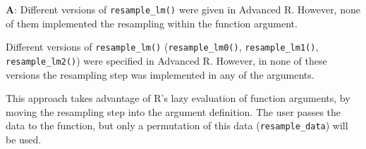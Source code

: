 \documentclass[
]{krantz}
\makeatletter
\newenvironment{Shaded}{\begin{snugshade}}{\end{snugshade}}
\newcommand{\CommentTok}[1]{\textcolor[rgb]{0.56,0.35,0.01}{\textit{#1}}}
\newcommand{\ControlFlowTok}[1]{\textcolor[rgb]{0.13,0.29,0.53}{\textbf{#1}}}
\newcommand{\DataTypeTok}[1]{\textcolor[rgb]{0.13,0.29,0.53}{#1}}
\newcommand{\DecValTok}[1]{\textcolor[rgb]{0.00,0.00,0.81}{#1}}
\newcommand{\KeywordTok}[1]{\textcolor[rgb]{0.13,0.29,0.53}{\textbf{#1}}}
\newcommand{\NormalTok}[1]{#1}
\newcommand{\OperatorTok}[1]{\textcolor[rgb]{0.81,0.36,0.00}{\textbf{#1}}}
\newcommand{\OtherTok}[1]{\textcolor[rgb]{0.56,0.35,0.01}{#1}}
\newcommand{\StringTok}[1]{\textcolor[rgb]{0.31,0.60,0.02}{#1}}
\newenvironment{kframe}{%
\medskip{}
\setlength{\fboxsep}{.8em}
 \def\at@end@of@kframe{}%
 \ifinner\ifhmode%
  \def\at@end@of@kframe{\end{minipage}}%
  \begin{minipage}{\columnwidth}%
 \fi\fi%
 \def\FrameCommand##1{\hskip\@totalleftmargin \hskip-\fboxsep
 \colorbox{shadecolor}{##1}\hskip-\fboxsep
     \hskip-\linewidth \hskip-\@totalleftmargin \hskip\columnwidth}%
 \MakeFramed {\advance\hsize-\width
   \@totalleftmargin\z@ \linewidth\hsize
   \@setminipage}}%
 {\par\unskip\endMakeFramed%
 \at@end@of@kframe}
\renewenvironment{Shaded}{\begin{kframe}}{\end{kframe}}
\renewcommand{\KeywordTok} [1]{\textcolor[rgb]{0.00,0.44,0.13}{{#1}}}
\renewcommand{\DataTypeTok}[1]{\textcolor[rgb]{0.56,0.13,0.00}{{#1}}}
\renewcommand{\DecValTok}  [1]{\textcolor[rgb]{0.25,0.63,0.44}{{#1}}}
\renewcommand{\StringTok}  [1]{\textcolor[rgb]{0.25,0.44,0.63}{{#1}}}
\renewcommand{\CommentTok} [1]{\textcolor[rgb]{0.38,0.63,0.69}{{#1}}}
\renewcommand{\OtherTok}   [1]{\textcolor[rgb]{0.00,0.44,0.13}{{#1}}}
\renewcommand{\NormalTok}  [1]{{#1}}
\makeatother
\begin{document}
\textbf{{A}}: Different versions of \texttt{resample\_lm()} were given in Advanced R. However, none of them implemented the resampling within the function argument.

Different versions of \texttt{resample\_lm()} (\texttt{resample\_lm0()}, \texttt{resample\_lm1()}, \texttt{resample\_lm2()}) were specified in Advanced R. However, in none of these versions the resampling step was implemented in any of the arguments.

This approach takes advantage of R's lazy evaluation of function arguments, by moving the resampling step into the argument definition. The user passes the data to the function, but only a permutation of this data (\texttt{resample\_data}) will be used.

\begin{Shaded}
\end{Shaded}
\end{document}
